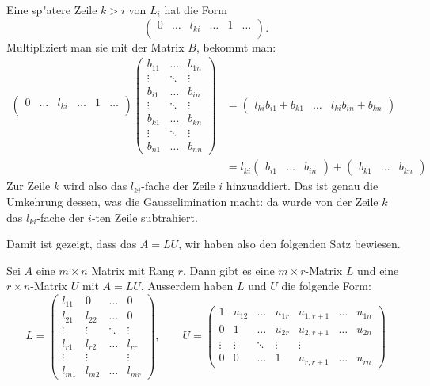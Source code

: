 Eine sp"atere Zeile $k>i$ von $L_i$ hat die Form
\[
\begin{pmatrix}
0&\dots&l_{ki}&\dots&1&\dots\\
\end{pmatrix}.
\]
Multipliziert man sie mit der Matrix $B$, bekommt man:
\begin{align*}
\begin{pmatrix}
0&\dots&l_{ki}&\dots&1&\dots\\
\end{pmatrix}
\begin{pmatrix}
b_{11}&\dots &b_{1n}\\
\vdots&\ddots&\vdots\\
b_{i1}&\dots &b_{in}\\
\vdots&\ddots&\vdots\\
b_{k1}&\dots&b_{kn}\\
\vdots&\ddots&\vdots\\
b_{n1}&\dots &b_{nn}
\end{pmatrix}
&=
\begin{pmatrix}
l_{ki}b_{i1}+b_{k1}
&\dots&
l_{ki}b_{in}+b_{kn}
\end{pmatrix}
\\
&=
l_{ki}
\begin{pmatrix}
b_{i1}
&\dots&
b_{in}
\end{pmatrix}
+
\begin{pmatrix}
b_{k1}
&\dots&
b_{kn}
\end{pmatrix}
\end{align*}
Zur Zeile $k$ wird also das $l_{ki}$-fache der Zeile
$i$ hinzuaddiert. Das ist genau die Umkehrung dessen, was
die Gausselimination macht: da wurde von der Zeile $k$
das $l_{ki}$-fache der $i$-ten Zeile subtrahiert.

Damit ist gezeigt, dass das $A=LU$, wir haben also den folgenden
Satz bewiesen.

\begin{satz}[LU-Zerlegung]
\label{ludecomposition}
Sei $A$ eine $m\times n$ Matrix mit Rang $r$.
Dann gibt es eine $m\times r$-Matrix $L$ und eine $r\times n$-Matrix
$U$ mit $A=LU$. Ausserdem haben $L$ und $U$ die folgende Form:
\[
L=\begin{pmatrix}
l_{11}&0&\dots&0\\
l_{21}&l_{22}&\dots&0\\
\vdots&\vdots&\ddots&\vdots\\
l_{r1}&l_{r2}&\dots&l_{rr}\\
\vdots&\vdots& &\vdots\\
l_{m1}&l_{m2}&\dots&l_{mr}
\end{pmatrix},\qquad
U=\begin{pmatrix}
1&u_{12}&\dots&u_{1r}&u_{1,r+1}&\dots&u_{1n}\\
0&1     &\dots&u_{2r}&u_{2,r+1}&\dots&u_{2n}\\
\vdots&\vdots&\ddots&\vdots&\vdots\\
0&0&\dots&1&u_{r,r+1}&\dots&u_{rn}
\end{pmatrix}
\]
\end{satz}

